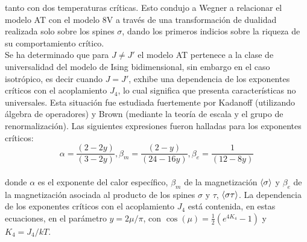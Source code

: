  tanto con dos temperaturas críticas. Esto condujo a Wegner \cite{AT_wegner} a relacionar el modelo AT con el modelo 8V a través de una transformación
 de dualidad realizada solo sobre los spines $\sigma$, dando los primeros indicios sobre la riqueza de su comportamiento crítico.\\
Se ha determinado que para $J \neq J'$ el modelo AT pertenece a la clase de universalidad del modelo de Ising bidimensional, sin embargo en el caso
 isotrópico, es decir cuando $J=J'$, exhibe una dependencia de los exponentes críticos con el acoplamiento $J_{4}$, lo cual significa que presenta características
 no universales. Esta situación fue estudiada fuertemente por Kadanoff \cite{AT8V_kadanoff_1977} (utilizando álgebra de operadores) y Brown (mediante la teoría de escala
 y el grupo de renormalización). Las siguientes expresiones fueron halladas para los exponentes críticos:
\\
\begin{equation}
	\label{eq:AT_crit_exps}
	\alpha =\frac{(2-2y)}{(3-2y)},\beta_{m}=\frac{(2-y)}{(24-16y)},\beta_{e}=\frac{1}{(12-8y)}
\end{equation}
\\

 donde $\alpha$ es el exponente del calor específico, $\beta_{m}$ de la magnetización $\langle \sigma \rangle$ y $\beta_{e}$ de la magnetización asociada al
 producto de los spines $\sigma$ y $\tau$, $\langle \sigma\tau \rangle$. La dependencia de los exponentes cr\'iticos con el acoplamiento $J_{4}$ est\'a contenida,
 en estas ecuaciones, en el par\'ametro $y=2\mu /\pi$, con $\cos(\mu)=\frac{1}{2}(e^{4K_{4}}-1)$ y $K_{4}=J_{4}/kT$.\\

